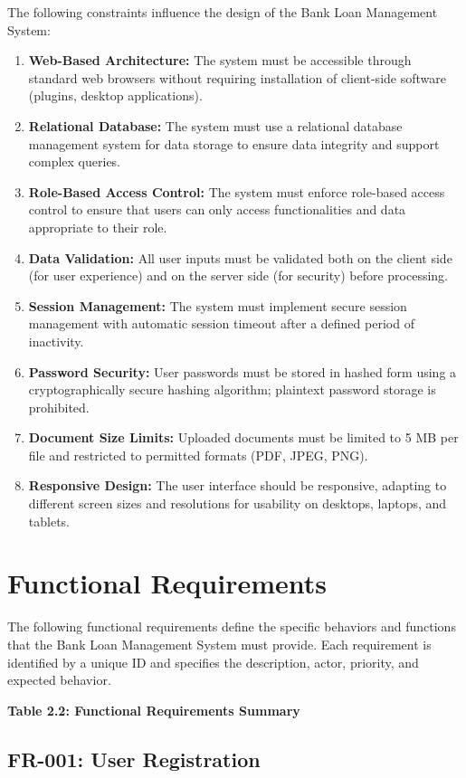 The following constraints influence the design of the Bank Loan Management System:

\begin{enumerate}
  \item \textbf{Web-Based Architecture:} The system must be accessible through standard web browsers without requiring installation of client-side software (plugins, desktop applications).
  \item \textbf{Relational Database:} The system must use a relational database management system for data storage to ensure data integrity and support complex queries.
  \item \textbf{Role-Based Access Control:} The system must enforce role-based access control to ensure that users can only access functionalities and data appropriate to their role.
  \item \textbf{Data Validation:} All user inputs must be validated both on the client side (for user experience) and on the server side (for security) before processing.
  \item \textbf{Session Management:} The system must implement secure session management with automatic session timeout after a defined period of inactivity.
  \item \textbf{Password Security:} User passwords must be stored in hashed form using a cryptographically secure hashing algorithm; plaintext password storage is prohibited.
  \item \textbf{Document Size Limits:} Uploaded documents must be limited to 5 MB per file and restricted to permitted formats (PDF, JPEG, PNG).
  \item \textbf{Responsive Design:} The user interface should be responsive, adapting to different screen sizes and resolutions for usability on desktops, laptops, and tablets.
\end{enumerate}

\section{Functional Requirements}

The following functional requirements define the specific behaviors and functions that the Bank Loan Management System must provide. Each requirement is identified by a unique ID and specifies the description, actor, priority, and expected behavior.

\textbf{Table 2.2: Functional Requirements Summary}

\subsection{FR-001: User Registration}

